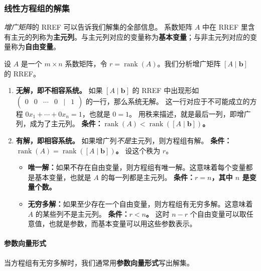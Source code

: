 \subsubsection{线性方程组的解集}

\emph{增广矩阵}的 RREF 可以告诉我们解集的全部信息。
系数矩阵 $A$ 中在 RREF 里含有主元的列称为\textbf{主元列}。与主元列对应的变量称为\textbf{基本变量}；与非主元列对应的变量称为\textbf{自由变量}。

设 $A$ 是一个 $m\times n$ 系数矩阵，令 $r=\operatorname{rank}(A)$。我们分析增广矩阵 $[A\mid\mathbf{b}]$ 的 RREF。

\begin{enumerate}
    \item \textbf{无解，即不相容系统。}
    如果 $[A\mid\mathbf{b}]$ 的 RREF 中出现形如 $\begin{pmatrix}0&0&\cdots&0&\mid&1\end{pmatrix}$ 的一行，那么系统无解。
    这一行对应于不可能成立的方程 $0x_1+\cdots+0x_n=1$，也就是 $0=1$。
    用秩来描述，就是最后一列，即增广列，成为了主元列。
    \textbf{条件：$\operatorname{rank}(A)<\operatorname{rank}([A\mid\mathbf{b}])$。}

    \item \textbf{有解，即相容系统。}
    如果增广列\emph{不是}主元列，则方程组有解。
    \textbf{条件：$\operatorname{rank}(A)=\operatorname{rank}([A\mid\mathbf{b}])$。} 设这个秩为 $r$。
    \begin{itemize}
        \item \textbf{唯一解：}如果不存在自由变量，则方程组有唯一解。这意味着每个变量都是基本变量，也就是 $A$ 的每一列都是主元列。
        \textbf{条件：$r=n$，其中 $n$ 是变量个数。}
        \item \textbf{无穷多解：}如果至少存在一个自由变量，则方程组有无穷多解。这意味着 $A$ 的某些列不是主元列。
        \textbf{条件：$r<n$。} 这时 $n-r$ 个自由变量可以取任意值，也就是参数，而基本变量可以用这些参数表示。
    \end{itemize}
\end{enumerate}

\paragraph{参数向量形式}
当方程组有无穷多解时，我们通常用\textbf{参数向量形式}写出解集。

